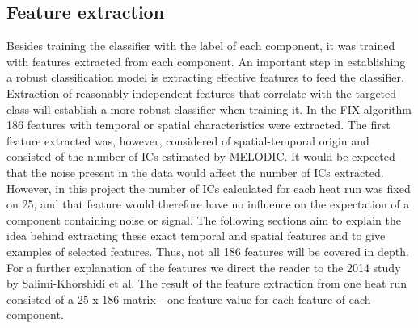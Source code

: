 \subsection{Feature extraction}
Besides training the classifier with the label of each component, it was trained with features extracted from each component. An important step in establishing a robust classification model is extracting effective features to feed the classifier. Extraction of reasonably independent features that correlate with the targeted class will establish a more robust classifier when training it. In the FIX algorithm 186 features with temporal or spatial characteristics were extracted. The first feature extracted was, however, considered of spatial-temporal origin and consisted of the number of ICs estimated by MELODIC. It would be expected that the noise present in the data would affect the number of ICs extracted. \cite{Salimi-Khorshidi2014} However, in this project the number of ICs calculated for each heat run was fixed on 25, and that feature would therefore have no influence on the expectation of a component containing noise or signal. 
The following sections aim to explain the idea behind extracting these exact temporal and spatial features and to give examples of selected features. Thus, not all 186 features will be covered in depth. For a further explanation of the features we direct the reader to the 2014 study by Salimi-Khorshidi et al. \cite{Salimi-Khorshidi2014} The result of the feature extraction from one heat run consisted of a 25 x 186 matrix - one feature value for each feature of each component.

